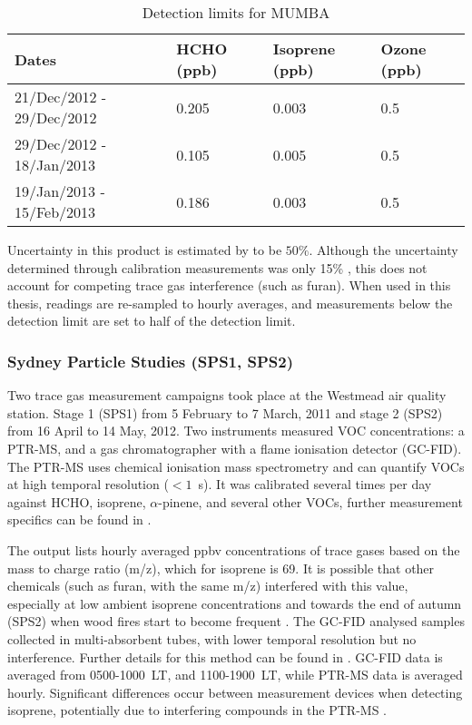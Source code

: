       
      \begin{table}
        \caption{Detection limits for MUMBA}
        \begin{tabular}{  l |  l  l  l }
          
          \textbf{Dates} & \textbf{HCHO (ppb)} & \textbf{Isoprene (ppb)} & \textbf{Ozone (ppb)}
          \\ \hline
          21/Dec/2012 - 29/Dec/2012 & 0.205 & 0.003 & 0.5 \\
          29/Dec/2012 - 18/Jan/2013 & 0.105 & 0.005 & 0.5 \\
          19/Jan/2013 - 15/Feb/2013 & 0.186 & 0.003 & 0.5 \\
        \end{tabular}
        \label{Model:datasets:MUMBA:tab_detectionlimits}
      \end{table}
      
      Uncertainty in this product is estimated by \textcite{Dunne2018} to be $50\%$.
      Although the uncertainty determined through calibration measurements was only 15\% \parencite{Guerette2018}, this does not account for competing trace gas interference (such as furan).
      When used in this thesis, readings are re-sampled to hourly averages, and measurements below the detection limit are set to half of the detection limit.
    
    \subsubsection{Sydney Particle Studies (SPS1, SPS2)}
    \label{Model:datasets:SPS}
      Two trace gas measurement campaigns took place at the Westmead air quality station. %
      Stage 1 (SPS1) from 5 February to 7 March, 2011 and stage 2 (SPS2) from 16 April to 14 May, 2012.
      Two instruments measured VOC concentrations: a PTR-MS, and a gas chromatographer with a flame ionisation detector (GC-FID).
      The PTR-MS uses chemical ionisation mass spectrometry and can quantify VOCs at high temporal resolution ($< 1$~s).
      It was calibrated several times per day against HCHO, isoprene, $\alpha$-pinene, and several other VOCs, further measurement specifics can be found in \textcite{Dunne2018}.
      
      The output lists hourly averaged ppbv concentrations of trace gases based on the mass to charge ratio (m/z), which for isoprene is 69.
      It is possible that other chemicals (such as furan, with the same m/z) interfered with this value, especially at low ambient isoprene concentrations and towards the end of autumn (SPS2) when wood fires start to become frequent \parencite{Guerette2018}.
      The GC-FID analysed samples collected in multi-absorbent tubes, with lower temporal resolution but no interference. 
      Further details for this method can be found in \textcite{Cheng2016}.
      GC-FID data is averaged from 0500-1000~LT, and 1100-1900~LT, while PTR-MS data is averaged hourly.
      Significant differences occur between measurement devices when detecting isoprene, potentially due to interfering compounds in the PTR-MS \parencite{Dunne2018}.
      

